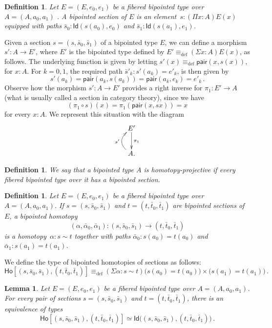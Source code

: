 \documentclass[reqno,10pt,a4paper,oneside]{amsart}
\numberwithin{equation}{section}
\theoremstyle{mythm}
\newtheorem{lemma}[theorem]{Lemma}
\theoremstyle{mydef}
\newtheorem{definition}[theorem]{Definition}
\theoremstyle{myrmk}
\newcommand{\ie}{\text{i.e.\ }}
\newcommand{\deq}{\equiv}
\newcommand{\defeq}{\deq_{\mathrm{def}}}
\newcommand{\co}{\colon}
\newcommand{\pair}{\mathsf{pair}}
\newcommand{\Id}{\mathsf{Id}}
\newcommand{\Ho}{\mathsf{Ho}}
\begin{document}
\begin{definition} \label{def:fibsection} Let $E = (E, e_0, e_1)$ be a fibered bipointed type over~$A = (A, a_0, a_1)$ . 
A \emph{bipointed section} of $E$ is an element~$s \co (\Pi x \co A) E(x)$ equipped with paths $\bar{s}_0 \co \Id(s(a_0), e_0)$ and $\bar{s}_1 \co \Id(s(a_1), e_1)$. 
\end{definition} 

Given a section $s = (s, \bar{s}_0, \bar{s}_1)$ of a bipointed type $E$, we can define a morphism $s' \co A \to E'$, where $E'$ is the
bipointed type defined by $E' \defeq (\Sigma x :A) E(x)$, as follows.
The underlying function is given by letting $s'(x) \defeq \pair(x, s(x))$, for $x : A$. For $k = 0, 1$, the required path $\bar{s}'_k \co s'(a_k) = e'_k$,
is then given by
\[
s'(a_k) = \pair(a_k, s(a_k)) =  \pair(a_k, e_k) = e'_k \, .
\]
Observe how the morphism $s' \co A \to E'$ provides a right inverse for $\pi_1 \co E' \to A$ (\ie what is usually called a section in 
category theory), since we have
\[
(\pi_1 \circ s)(x) = \pi_1 (\pair(x, sx)) = x 
\]
for every $x \co A$. We represent this situation with the diagram
\[
\xymatrix{
E' \ar[d]^{\pi_1} \\
A . \ar@/^1.2pc/[u]^{s'} }
\]

\begin{definition} We say that a bipointed type $A$ is \emph{homotopy-projective} if every fibered bipointed type over it has a bipointed section.
\end{definition} 

\begin{definition} \label{def:2cellsection} Let $E = (E, e_0, e_1)$ be a fibered bipointed type over $A = (A, a_0, a_1)$. If $s = (s, \bar{s}_0, 
\bar{s}_1)$ and $t = (t, \bar{t}_0, \bar{t}_1)$ are bipointed sections of $E$, a \emph{bipointed homotopy} 
\[
(\alpha, \bar{\alpha}_0, \bar{\alpha}_1) \co (s, \bar{s}_0, \bar{s}_1)  \rightarrow (t, \bar{t}_0, \bar{t}_1)
\] 
is a homotopy~$\alpha \co s \sim t$ together with paths $\bar{\alpha}_0 \co s(a_0) = t(a_0)$ and $\bar{\alpha}_1 \co s(a_1) = t(a_1)$. 
\end{definition} 


We define the type of bipointed homotopies of sections as follows:
\[
\Ho[ (s, \bar{s}_0, \bar{s}_1), (t, \bar{t}_0, \bar{t}_1)] \defeq
(\Sigma \alpha \co s \sim t) \big( s(a_0) = t(a_0) \big) \times \big( s(a_1) = t(a_1) \big) \, .
\]


\begin{lemma} Let $E = (E, e_0, e_1)$ be a fibered bipointed type over $A = (A, a_0, a_1)$. 
For every pair of sections $s = (s, \bar{s}_0, \bar{s}_1)$ and $t = (t, \bar{t}_0, \bar{t}_1)$, 
there is an equivalence of types
\[
\Ho[ (s, \bar{s}_0, \bar{s}_1), (t, \bar{t}_0, \bar{t}_1)] 
\simeq 
\Id\big( (s, \bar{s}_0, \bar{s}_1), (t, \bar{t}_0, \bar{t}_1) \big) \, .
\]
\end{lemma}
\end{document}
